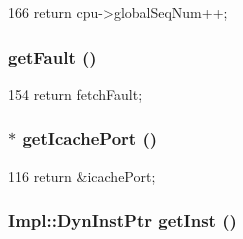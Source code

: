 \begin{DoxyCode}
166     { return cpu->globalSeqNum++; }
\end{DoxyCode}
\hypertarget{classFrontEnd_ab9b1142cc382fcfba846b1998e6c2f17}{
\subsubsection[{getFault}]{ getFault ()}}
\label{classFrontEnd_ab9b1142cc382fcfba846b1998e6c2f17}



\begin{DoxyCode}
154 { return fetchFault; }
\end{DoxyCode}
\hypertarget{classFrontEnd_a530e48c3dbd3fa3fc72df27f49ed09a9}{
\subsubsection[{getIcachePort}]{$\ast$ getIcachePort ()}}
\label{classFrontEnd_a530e48c3dbd3fa3fc72df27f49ed09a9}



\begin{DoxyCode}
116 { return &icachePort; }
\end{DoxyCode}
\hypertarget{classFrontEnd_a2032af0310bc2b8b708cac0af3811074}{
\subsubsection[{getInst}]{\setlength{\rightskip}{0pt plus 5cm}Impl::DynInstPtr getInst ()}}
\label{classFrontEnd_a2032af0310bc2b8b708cac0af3811074}



